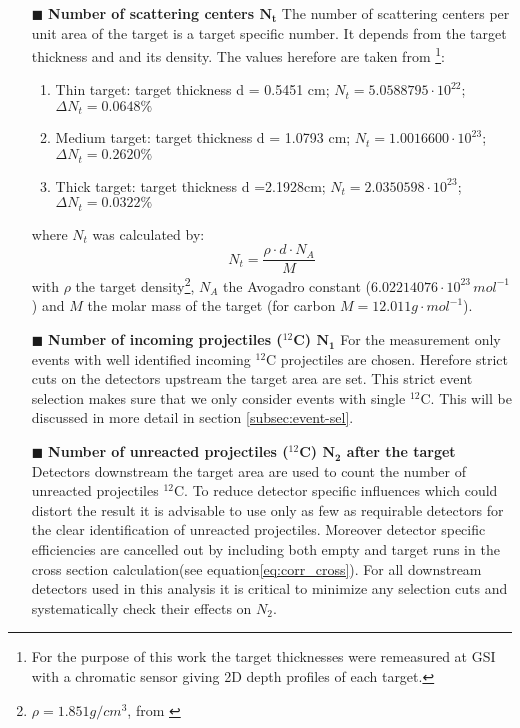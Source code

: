 \begin{enumerate}
\item[$\blacksquare$] \textbf{Number of scattering centers $\mathbf{N_t}$}\newline
The number of scattering centers per unit area of the target is a target specific number. It depends from the target thickness and and its density. The values herefore are taken from \cite{ponnath2023precise}\footnote{For the purpose of this work the target thicknesses were remeasured at GSI with a chromatic sensor giving 2D depth profiles of each target.}:
\begin{enumerate}
\item Thin target:\newline 
target thickness d = 0.5451 cm; $N_t = 5.0588795\cdot 10^{22}$; $\Delta N_t = 0.0648\%$
\item Medium target:\newline
target thickness d = 1.0793 cm; $N_t = 1.0016600\cdot 10^{23}$; $\Delta N_t = 0.2620\%$
\item Thick target:\newline
target thickness d =2.1928cm; $N_t = 2.0350598\cdot 10^{23}$; $\Delta N_t = 0.0322\%$
\end{enumerate} 
where $N_t$ was calculated by:
\begin{equation}
N_t = \frac{\rho \cdot d \cdot N_A}{M}
\end{equation}
with $\rho$ the target density\footnote{$\rho = 1.851 g/cm^{3}$, from \cite{ponnath2023precise}}, $N_A$ the Avogadro constant ($6.02214076\cdot10^{23}\,mol^{-1}$) and $M$ the molar mass of the target (for carbon $M = 12.011g \cdot mol^{-1}$).
\item[$\blacksquare$] \textbf{Number of incoming projectiles ($^{12}$C) $\mathbf{N_1}$}\newline
For the measurement only events with well identified incoming $^{12}$C projectiles are chosen. Herefore strict cuts on the detectors upstream the target area are set. This strict event selection makes sure that we only consider events with single $^{12}$C. This will be discussed in more detail in section \ref{subsec:event-sel}.  %
\item[$\blacksquare$] \textbf{Number of unreacted projectiles ($^{12}$C) $\mathbf{N_2}$ after the target}\newline
Detectors downstream the target area are used to count the number of unreacted projectiles $^{12}$C. To reduce detector specific influences which could distort the result it is advisable to use only as few as requirable detectors for the clear identification of unreacted projectiles. Moreover detector specific efficiencies are cancelled out by including both empty and target runs in the cross section calculation(see equation\ref{eq:corr_cross}). For all downstream detectors used in this analysis it is critical to minimize any selection cuts and systematically check their effects on $N_2$.
\end{enumerate}
